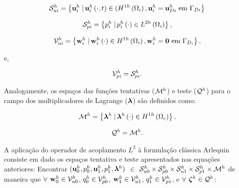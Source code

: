 \documentclass[tese_patricia]{subfiles}
\begin{document}
\begin{align}
	\mathcal{S}_{ui}^h = \left\{\mathbf{u}_{i}^{h} \left . \right| \mathbf{u}_{i}^{h} \left(\cdot,t\right) \in (H^{1h}\left(\Omega_{i}\right), \mathbf{u}_{i}^{h} = \mathbf{u}_{Di}^{h} \textrm { em}  \ \Gamma_{Di} \right\}
\end{align}

\begin{align}
	\mathcal{S}_{pi}^h = \left\{p_{i}^{h} \left . \right| p_{i}^{h} \left(\cdot\right) \in L^{2h}\left(\Omega_{i}\right) \right\},
\end{align}

\begin{align}
	\mathcal{V}_{ui}^h = \left\{\mathbf{w}_{i}^{h} \left . \right| \mathbf{w}_{i}^{h} \left(\cdot\right) \in H^{1h}\left(\Omega_i\right), \mathbf{w}_{i}^{h} = \mathbf{0} \textrm { em} \ \Gamma_{D_i} \right\},
\end{align}

e,

\begin{align}
	\mathcal{V}_{pi}^h = \mathcal{S}_{pi}^h.
\end{align}

Analogamente, os espaços das funções tentativas ($\mathcal{M}^h$) e teste ($\mathcal{Q}^h$) para o campo dos multiplicadores de Lagrange ($\boldsymbol{\lambda}$) são definidos como:

\begin{align}
	\mathcal{M}^h = \left\{\boldsymbol{\lambda}^{h} \left . \right| \boldsymbol{\lambda}^{h} \left(\cdot\right) \in H^{1h}\left(\Omega_{c}\right) \right\},
\end{align}

\begin{align}
	\mathcal{Q}^h = \mathcal{M}^h.
\end{align}

A aplicação do operador de acoplamento $L^{2}$ à formulação clássica Arlequin consiste em dado os espaços tentativa e teste apresentados nas equações anteriores: Encontrar $(\mathbf{u}_0^h,p_0^h,\mathbf{u}_1^h,p_1^h,\boldsymbol{\lambda}^h)$ $\in$ $\mathcal{S}_{u0}^h \times \mathcal{S}_{p0}^h \times \mathcal{S}_{u1}^h \times \mathcal{S}_{p1}^h \times \mathcal{M}^h$ de maneira que  $\forall$ $\mathbf{w}_0^h \in \mathcal{V}_{u0}^h$, $q_0^h \in \mathcal{V}_{p0}^h$, $\mathbf{w}_1^h \in \mathcal{V}_{u1}^h$, $q_1^h \in \mathcal{V}_{p1}^h$, e $\forall$ $\boldsymbol{\zeta}^h \in \mathcal{Q}^h$:
\end{document}
